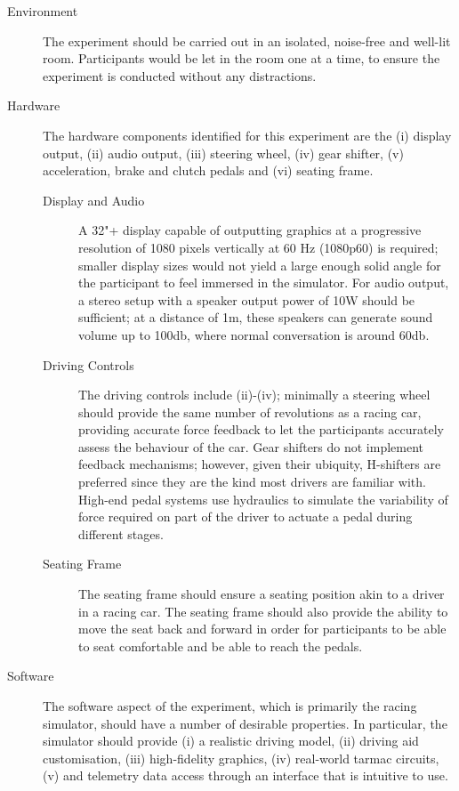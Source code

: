 \begin{description}
	\item [Environment] The experiment should be carried out in an isolated, noise-free and well-lit room. Participants would be let in the room one at a time, to ensure the experiment is conducted without any distractions.
	\item [Hardware] The hardware components identified for this experiment are the (i) display output, (ii) audio output, (iii) steering wheel, (iv) gear shifter, (v) acceleration, brake and clutch pedals and (vi) seating frame.
	\begin{description}
		\item [Display and Audio] A 32"+ display capable of outputting graphics at a progressive resolution of 1080 pixels vertically at 60 Hz (1080p60) is required; smaller display sizes would not yield a large enough solid angle for the participant to feel immersed in the simulator. For audio output, a stereo setup with a speaker output power of 10W should be sufficient; at a distance of 1m, these speakers can generate sound volume up to 100db, where normal conversation is around 60db.
		\item [Driving Controls] The driving controls include (ii)-(iv); minimally a steering wheel should provide the same number of revolutions as a racing car, providing accurate force feedback to let the participants accurately assess the behaviour of the car. Gear shifters do not implement feedback mechanisms; however, given their ubiquity, H-shifters are preferred since they are the kind most drivers are familiar with. High-end pedal systems use hydraulics to simulate the variability of force required on part of the driver to actuate a pedal during different stages.
		\item [Seating Frame] The seating frame should ensure a seating position akin to a driver in a racing car. The seating frame should also provide the ability to move the seat back and forward in order for participants to be able to seat comfortable and be able to reach the pedals.
	\end{description}
	\item [Software] The software aspect of the experiment, which is primarily the racing simulator, should have a number of desirable properties. In particular, the simulator should provide (i) a realistic driving model, (ii) driving aid customisation, (iii) high-fidelity graphics, (iv) real-world tarmac circuits, (v) and telemetry data access through an interface that is intuitive to use.

\end{description}
